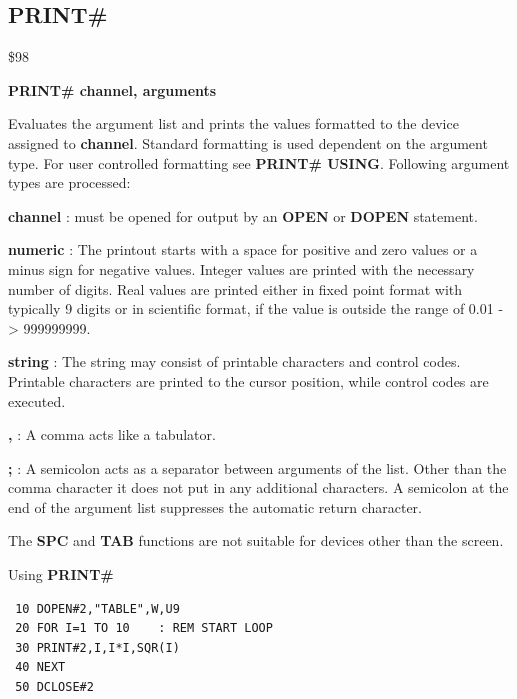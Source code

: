 
\newpage
\subsection{PRINT\#}
\begin{description}[leftmargin=2cm,style=nextline]
\item [Token:] \$98
\item [Format:] {\bf PRINT\# channel, arguments}
\item [Usage:]  Evaluates the argument list and prints the values
                formatted to the device assigned to {\bf channel}.
                Standard formatting is used dependent on the
                argument type. For user controlled formatting
                see {\bf PRINT\# USING}.
                Following argument types are processed:

                {\bf channel} : must be opened for output by
                an {\bf OPEN} or {\bf DOPEN} statement.

                {\bf numeric} : The printout starts with a space
                for positive and zero values or a minus sign for
                negative values. Integer values are printed with
                the necessary number of digits. Real values are
                printed either in fixed point format with typically
                9 digits or in scientific format, if the value is
                outside the range of 0.01 -> 999999999.

                {\bf string} : The string may consist of printable
                characters and control codes. Printable characters
                are printed to the cursor position, while control
                codes are executed.

                {\bf ,} : A comma acts like a tabulator.

                {\bf ;} : A semicolon acts as a separator between
                arguments of the list. Other than the comma character
                it does not put in any additional characters.
                A semicolon at the end of the argument list suppresses
                the automatic return character.

\item [Remarks:] The {\bf SPC} and {\bf TAB} functions
                 are not suitable for devices other than the screen.

\item [Example:] Using {\bf PRINT\#}

\begin{tcolorbox}[colback=black,coltext=white]
\verbatimfont{\codefont}
\begin{verbatim}
 10 DOPEN#2,"TABLE",W,U9
 20 FOR I=1 TO 10    : REM START LOOP
 30 PRINT#2,I,I*I,SQR(I)
 40 NEXT
 50 DCLOSE#2
\end{verbatim}
\end{tcolorbox}
\end{description}

